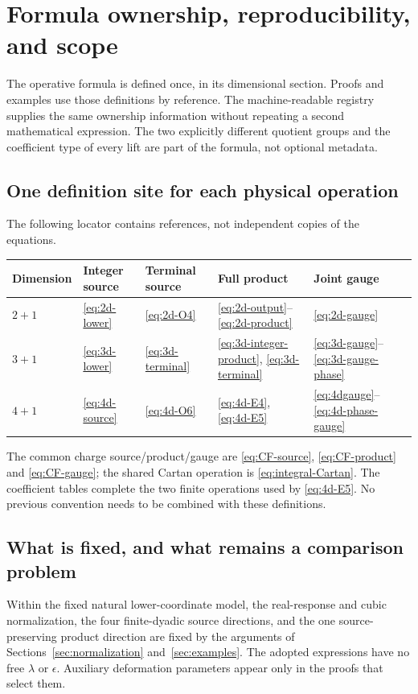 \section{Formula ownership, reproducibility, and scope}\label{sec:reproducibility}\label{sec:boundaries}
The operative formula is defined once, in its dimensional section. Proofs and examples use those definitions by reference. The machine-readable registry supplies the same ownership information without repeating a second mathematical expression. The two explicitly different quotient groups and the coefficient type of every lift are part of the formula, not optional metadata.


\subsection{One definition site for each physical operation}
The following locator contains references, not independent copies of the equations.
\begin{center}
\begin{tabular}{@{}lllll@{}}\toprule
Dimension & Integer source & Terminal source & Full product & Joint gauge\\\midrule
$2+1$ & \eqref{eq:2d-lower} & \eqref{eq:2d-O4} & \eqref{eq:2d-output}--\eqref{eq:2d-product} & \eqref{eq:2d-gauge}\\
$3+1$ & \eqref{eq:3d-lower} & \eqref{eq:3d-terminal} & \eqref{eq:3d-integer-product}, \eqref{eq:3d-terminal} & \eqref{eq:3d-gauge}--\eqref{eq:3d-gauge-phase}\\
$4+1$ & \eqref{eq:4d-source} & \eqref{eq:4d-O6} & \eqref{eq:4d-E4}, \eqref{eq:4d-E5} & \eqref{eq:4dgauge}--\eqref{eq:4d-phase-gauge}\\\bottomrule
\end{tabular}
\end{center}
The common charge source/product/gauge are \eqref{eq:CF-source}, \eqref{eq:CF-product} and \eqref{eq:CF-gauge}; the shared Cartan operation is \eqref{eq:integral-Cartan}. The coefficient tables complete the two finite operations used by \eqref{eq:4d-E5}. No previous convention needs to be combined with these definitions.

\subsection{What is fixed, and what remains a comparison problem}
Within the fixed natural lower-coordinate model, the real-response and cubic normalization, the four finite-dyadic source directions, and the one source-preserving product direction are fixed by the arguments of Sections~\ref{sec:normalization} and~\ref{sec:examples}. The adopted expressions have no free $\lambda$ or $\epsilon$. Auxiliary deformation parameters appear only in the proofs that select them.

